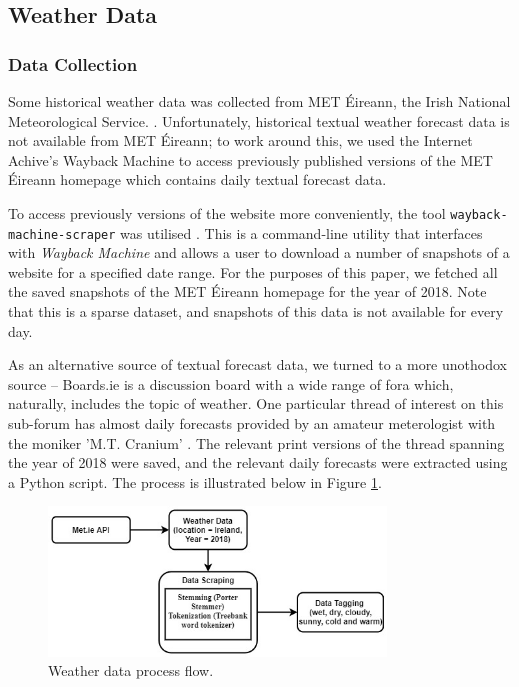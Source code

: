 \documentclass[a4paper,10pt]{article}
\begin{document}
\subsection{Weather Data}

\subsubsection{Data Collection}

Some historical weather data was collected from MET \'{E}ireann, the Irish National Meteorological Service. . Unfortunately, historical textual weather forecast data is not available from MET \'{E}ireann; to work around this, we used the Internet Achive's Wayback Machine  to access previously published versions of the MET \'{E}ireann homepage which contains daily textual forecast data.

To access previously versions of the website more conveniently, the tool \texttt{wayback-machine-scraper} was utilised . This is a command-line utility that interfaces with \textit{Wayback Machine} and allows a user to download a number of snapshots of a website for a specified date range. For the purposes of this paper, we fetched all the saved snapshots of the MET \'{E}ireann homepage for the year of 2018. Note that this is a sparse dataset, and snapshots of this data is not available for every day.

As an alternative source of textual forecast data, we turned to a more unothodox source -- Boards.ie is a discussion board with a wide range of fora which, naturally, includes the topic of weather. One particular thread of interest on this sub-forum has almost daily forecasts provided by an amateur meterologist with the moniker 'M.T. Cranium' . The relevant print versions of the thread spanning the year of 2018 were saved, and the relevant daily forecasts were extracted using a Python script. The process is illustrated below in Figure \ref{fig:weather_process_flow}.

\begin{figure}
    \includegraphics[width=0.8\textwidth]{weather_process_flow.jpeg}
    \caption{Weather data process flow.}
    \label{fig:weather_process_flow}
\end{figure}
\end{document}
